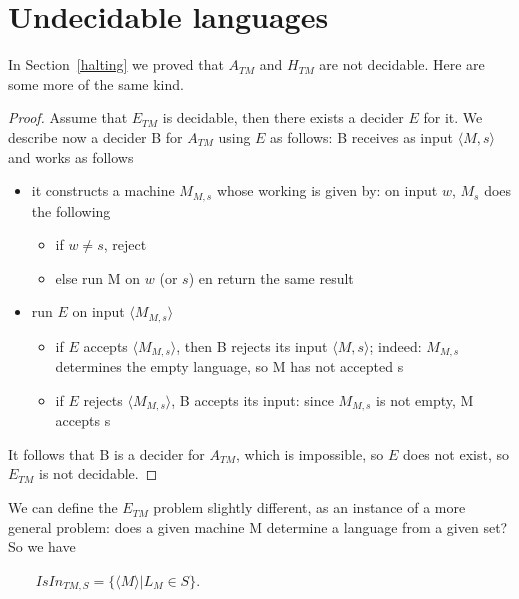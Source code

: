 \section{Undecidable languages}

In Section~\ref{halting} we proved that $A_{TM}$ and $H_{TM}$ are not
decidable. Here are some more of the same kind.

\begin{proof}
Assume that $E_{TM}$ is decidable, then there exists a decider $E$ for
it. We describe now a decider B for $A_{TM}$ using $E$ as follows:
B receives as input $\langle M,s \rangle$ and works as follows
\begin{itemize}
\item 
it constructs a machine $M_{M,s}$ whose working is given by: on input
$w$, $M_s$ does the following
\begin{itemize}
\item if $w \neq s$, reject
\item else run M on $w$ (or $s$) en return the same result
\end{itemize}

\item 
run $E$ on input $\langle M_{M,s} \rangle$
\begin{itemize}
\item if $E$ accepts $\langle M_{M,s} \rangle$, then B rejects its
  input $\langle M,s \rangle$; indeed: $M_{M,s}$ determines the empty
  language, so M has not accepted s
\item if $E$ rejects $\langle M_{M,s} \rangle$, B accepts its input: since  $M_{M,s}$ is not empty, M accepts s
\end{itemize}

\end{itemize}
It follows that B is a decider for $A_{TM}$, which is impossible, so
$E$ does not exist, so $E_{TM}$ is not decidable.
\end{proof}

We can define the $E_{TM}$ problem slightly different, as an instance
of a more general problem: does a given machine M determine a language
from a given set? So we have

$~~~~~~~~~IsIn_{TM,S} = \{\langle M \rangle| L_M \in S\}$.


